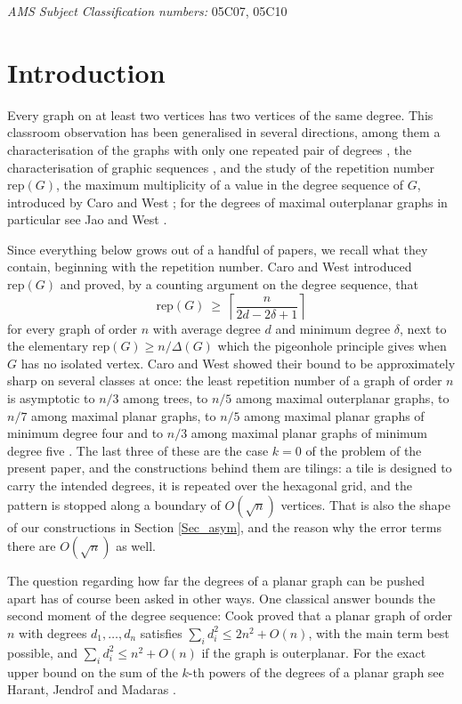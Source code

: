 \documentclass[12pt,a4paper]{article}%
\begin{document}
\textit{AMS Subject Classification numbers:} 05C07, 05C10

\section{Introduction}


Every graph on at least two vertices has two vertices of the same degree. This classroom observation
has been generalised in several directions, among them a characterisation of the graphs with only one repeated pair of
degrees \cite{BehzadChartrand}, the characterisation of graphic sequences
\cite{ErdosGallai, Hakimi, Havel}, and the study of the repetition number $\mathrm{rep}(G)$, the
maximum multiplicity of a value in the degree sequence of $G$, introduced by Caro and West
\cite{CaroWest}; for the degrees of maximal outerplanar graphs in particular see Jao and West
\cite{JaoWest}.

Since everything below grows out of a handful of papers, we recall what they contain, beginning with
the repetition number. Caro and West \cite{CaroWest} introduced $\mathrm{rep}(G)$ and proved, by a
counting argument on the degree sequence, that
\[
\mathrm{rep}(G)\ \geq \ \left\lceil \frac{n}{2d-2\delta +1}\right\rceil
\]
for every graph of order $n$ with average degree $d$ and minimum degree $\delta $, next to the
elementary $\mathrm{rep}(G)\geq n/\Delta (G)$ which the pigeonhole principle gives when $G$ has no
isolated vertex.  Caro and West showed
their bound to be approximately sharp on several classes at once: the least repetition number of a
graph of order $n$ is asymptotic to $n/3$ among trees, to $n/5$ among maximal outerplanar graphs, to
$n/7$ among maximal planar graphs, to $n/5$ among maximal planar graphs of minimum degree four and to
$n/3$ among maximal planar graphs of minimum degree five \cite[Theorem 2.5]{CaroWest}. The last three of
these are the case $k=0$ of the problem of the present paper, and the constructions behind them are
tilings: a tile is designed to carry the intended degrees, it is repeated over the hexagonal grid, and
the pattern is stopped along a boundary of $O(\sqrt{n})$ vertices. That is also the shape of our
constructions in Section \ref{Sec_asym}, and the reason why the error terms there are $O(\sqrt{n})$ as
well.

The question regarding how far the degrees of a planar graph can be pushed apart has of course been asked in
other ways. One classical answer bounds the second moment of the degree sequence: Cook \cite{Cook}
proved that a planar graph of order $n$ with degrees $d_{1},\ldots ,d_{n}$ satisfies
$\sum_{i}d_{i}^{2}\leq 2n^{2}+O(n)$, with the main term best possible, and $\sum_{i}d_{i}^{2}\leq
n^{2}+O(n)$ if the graph is outerplanar. For the exact upper bound on the sum of the $k$-th powers of the degrees of a planar graph see Harant,
Jendro\v{l} and Madaras \cite{HarantJendrolMadaras}. 
\end{document}
